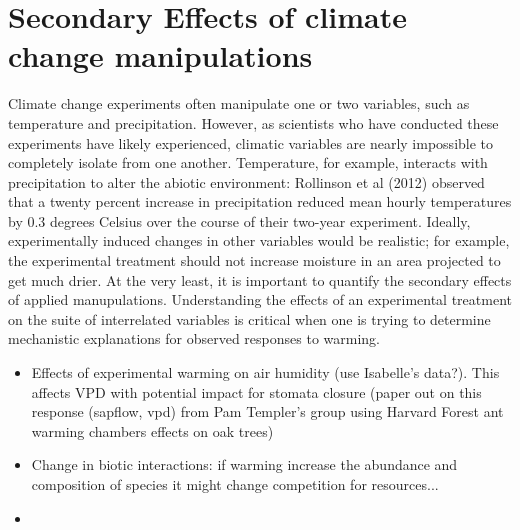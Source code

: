 \documentclass{article}
\begin{document}
\section {Secondary Effects of climate change manipulations}
Climate change experiments often manipulate one or two variables, such as temperature and precipitation. However, as scientists who have conducted these experiments have likely experienced, climatic variables are nearly impossible to completely isolate from one another.  Temperature, for example, interacts with precipitation to alter the abiotic environment: Rollinson et al (2012) observed that a twenty percent increase in precipitation reduced mean hourly temperatures by 0.3 degrees Celsius over the course of their two-year experiment. Ideally, experimentally induced changes in other variables would be realistic; for example, the experimental treatment should not increase moisture in an area projected to get much drier. At the very least, it is important to quantify the secondary effects of applied manupulations.  Understanding the effects of an experimental treatment on the suite of interrelated variables is critical when one is trying to determine mechanistic explanations for observed responses to warming.
\begin{itemize}
\item Effects of experimental warming on air humidity (use Isabelle's data?). This affects VPD with potential impact for stomata closure (paper out on this response (sapflow, vpd) from Pam Templer's group using Harvard Forest ant warming chambers effects on oak trees)
\item Change in biotic interactions: if warming increase the abundance and composition of species it might change competition for resources...
\item 
\end{itemize}
\end{document}
